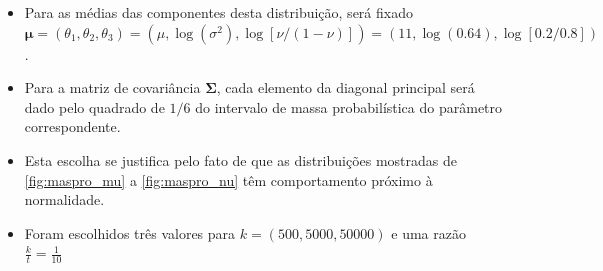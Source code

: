 \documentclass[9pt]{beamer}
\begin{document}
\begin{frame}
\begin{itemize}
\justifying	

\item Para as médias das componentes desta distribuição, será fixado $\bm{\mu} = (\theta_1, \theta_2, \theta_3) = (\mu, \log(\sigma^2), \log[\nu/(1-\nu)]) = (11, \log(0.64), \log[0.2/0.8])$.
\item Para a matriz de covariância $\bm{\Sigma}$, cada elemento da diagonal principal será dado pelo quadrado de $1/6$ do intervalo de massa probabilística do parâmetro correspondente.
\item Esta escolha se justifica pelo fato de que as distribuições mostradas de \ref{fig:maspro_mu} a \ref{fig:maspro_nu} têm comportamento próximo à normalidade.
\item Foram escolhidos três valores para $k = (500, 5000, 50000)$ e uma razão $\frac{k}{t}=\frac{1}{10}$
\end{itemize}
\end{frame}
\end{document}
